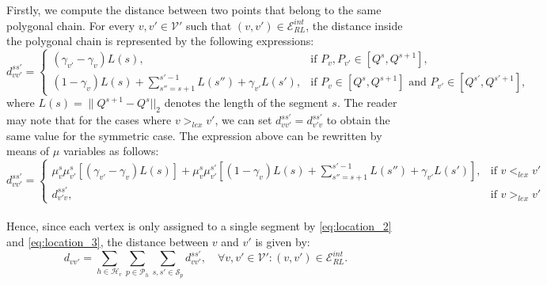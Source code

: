 \documentclass[12pt]{elsarticle}
\begin{document}
Firstly, we compute the distance between two points that belong to the same polygonal chain. For every $v, v'\in\mathcal V'$ such that $(v,v')\in\mathcal E_{RL}^{int}$, the distance inside the polygonal chain is represented by the following expressions:
\begin{equation*}
 d_{vv'}^{ss'}= \left \{\begin{array}{lr}
 (\gamma_{v'}-\gamma_v) L(s),   & \mbox{if } P_v, P_{v'}\in [Q^s,Q^{s+1}], \\
(1-\gamma_v) L(s)+\displaystyle\sum_{s''=s+1}^{s'-1} L(s'')+\gamma_{v'} L(s'),  & \mbox{if } P_v\in[Q^s,Q^{s+1}]\mbox{ and } P_{v'} \in [Q^{s'}, Q^{s'+1}], 
 \end{array} \right.
\end{equation*}
where $L(s)=\|Q^{s+1}-Q^s||_2$ denotes the length of the segment $s$. The reader may note that for the cases where $v>_{lex} v'$, we can set $d_{vv'}^{ss'}=d_{v'v}^{ss'}$ to obtain the same value for the symmetric case. 
The expression above can be rewritten by means of $\mu$ variables as follows:
\begin{equation*}\label{eq:distance_1}\tag{$Dist-C_1$}
    d_{vv'}^{ss'}=\left \{\begin{array}{lr} \mu_v^s\mu_{v'}^{s}\left[(\gamma_{v'}-\gamma_v)L(s)\right]+\mu_v^s\mu_{v'}^{s'}\left[(1-\gamma_v) L(s)+\displaystyle\sum_{s''=s+1}^{s'-1} L(s'')+\gamma_{v'} L(s')\right], & \mbox{if } v <_{lex} v'\\
    d_{v'v}^{ss'}, & \mbox{if } v >_{lex} v'\end{array}\right. 
\end{equation*}
\\
Hence, since each vertex is only assigned to a single segment by \eqref{eq:location_2} and \eqref{eq:location_3}, the distance between $v$ and $v'$ is given by:
\begin{equation*}\label{eq:distance_2}\tag{$Dist-C_2$}    
d_{vv'}=\sum_{h\in\mathcal H_r}\sum_{p\in\mathcal P_h}\sum_{s, s'\in\mathcal S_p}d_{vv'}^{ss'},\quad \forall v, v'\in\mathcal V': (v,v')\in\mathcal E_{RL}^{int}.
\end{equation*}
\end{document}
